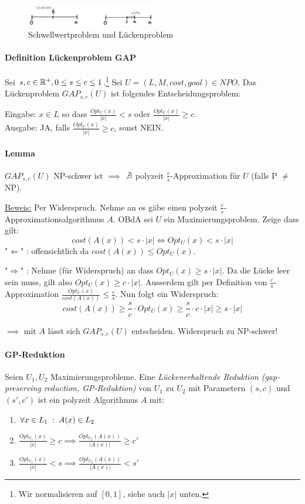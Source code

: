 \begin{figure}[h]
    \centering
    \includegraphics[width=0.5\textwidth]{images/schwellwertproblem-lueckenproblem.jpg}
    \caption{Schwellwertproblem und Lückenproblem}
\end{figure}

\paragraph{Definition Lückenproblem GAP}
Sei $s, c\in \mathbb{R}^+, 0 \leq s \leq c \leq 1$.\footnote{Wir normalisieren auf $[0,1]$, siehe auch $|x|$ unten.}
Sei $U = (L, M, cost, goal) \in NPO$.
Das Lückenproblem $GAP_{s,c}(U)$ ist folgendes Entscheidungsproblem:

Eingabe:
$x \in L$ so dass $\frac{Opt_U(x)}{|x|} < s$ oder $\frac{Opt_U(x)}{|x|} \geq c$.
\\
Ausgabe:
JA, falls $\frac{Opt_U(x)}{|x|} \geq c$, sonst NEIN.

\paragraph{Lemma}
$GAP_{s,c}(U)$ NP-schwer ist $\implies$ $\not \exists$ polyzeit $\frac{c}{s}$-Approximation
für $U$ (falls P $\neq$ NP).

\underline{Beweis:}
Per Widerspruch. Nehme an es gäbe einen polyzeit $\frac{c}{s}$-Approximationsalgorithmus $A$.
OBdA sei $U$ ein Maximierungsproblem.
Zeige dass gilt:
$$ cost(A(x)) < s \cdot |x| \iff Opt_U(x) < s \cdot |x| $$
%
"$\Leftarrow$" : offensichtlich da $cost(A(x)) \leq Opt_U(x)$.

"$\Rightarrow$" : Nehme (für Widerspruch) an dass $Opt_U(x) \geq s \cdot |x|$.
Da die Lücke leer sein muss, gilt also $Opt_U(x) \geq c \cdot |x|$.
Ausserdem gilt per Definition von $\frac{c}{s}$-Approximation
$\frac{Opt_U(x)}{cost(A(x))} \leq \frac{c}{s}$.
Nun folgt ein Widerspruch:
$$ cost(A(x)) \geq \frac{s}{c} \cdot Opt_U(x) \geq \frac{s}{c} \cdot c \cdot |x| \geq s \cdot |x| $$

$\implies$ mit $A$ lässt sich $GAP_{s,c}(U)$ entscheiden. Widerspruch zu NP-schwer!

\paragraph{GP-Reduktion}
Seien $U_1, U_2$ Maximierungsprobleme.
Eine \emph{Lückenerhaltende Reduktion (gap-preserving reduction, GP-Reduktion)}
von $U_1$ zu $U_2$ mit Parametern $(s,c)$ und $(s',c')$ ist ein polyzeit Algorithmus $A$ mit:
\begin{enumerate}[label=(\roman*)]
    \item $ \forall x\in L_1 \; : \; A(x) \in L_2 $
    \item $ \frac{Opt_{U_1}(x)}{|x|} \geq c \implies \frac{Opt_{U_2}(A(x))}{|A(x)|} \geq c' $
    \item $ \frac{Opt_{U_1}(x)}{|x|} < s \implies \frac{Opt_{U_2}(A(x))}{|A(x)|} < s' $
\end{enumerate}

